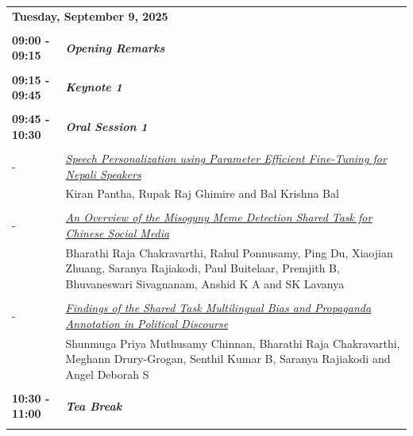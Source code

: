 \documentclass[11pt,oneside]{book}
\begin{document}
        \begin{tabular}{p{24mm}p{124mm}}
    \multicolumn{2}{l}{\bf Tuesday, September 9, 2025 } \\\\
                \textbf{09:00 - 09:15} & \emph{\textbf{Opening Remarks}}\\\\
      
                      \textbf{09:15 - 09:45} & \emph{\textbf{Keynote 1}}\\\\
      
                      \textbf{09:45 - 10:30} & \emph{\textbf{Oral Session 1}}\\\\
      
                
                       -  & \hyperlink{page.189}{\emph{Speech Personalization using Parameter Efficient Fine-Tuning for Nepali Speakers}}\\
        & Kiran Pantha\index{Pantha}, Rupak Raj Ghimire\index{Ghimire} and Bal Krishna Bal\index{Bal}\\\\
                
                       -  & \hyperlink{page.199}{\emph{An Overview of the Misogyny Meme Detection Shared Task for Chinese Social Media}}\\
        & Bharathi Raja Chakravarthi\index{Chakravarthi}, Rahul Ponnusamy\index{Ponnusamy}, Ping Du\index{Du}, Xiaojian Zhuang\index{Zhuang}, Saranya Rajiakodi\index{Rajiakodi}, Paul Buitelaar\index{Buitelaar}, Premjith B\index{B}, Bhuvaneswari Sivagnanam\index{Sivagnanam}, Anshid K A\index{A} and SK Lavanya\index{Lavanya}\\\\
                
                       -  & \hyperlink{page.208}{\emph{Findings of the Shared Task Multilingual Bias and Propaganda Annotation in Political Discourse}}\\
        & Shunmuga Priya Muthusamy Chinnan\index{Chinnan}, Bharathi Raja Chakravarthi\index{Chakravarthi}, Meghann Drury-Grogan\index{Drury-Grogan}, Senthil Kumar B\index{B}, Saranya Rajiakodi\index{Rajiakodi} and Angel Deborah S\index{S}\\\\
                      \textbf{10:30 - 11:00} & \emph{\textbf{Tea Break}}\\\\
      

\end{tabular}
\end{document}

